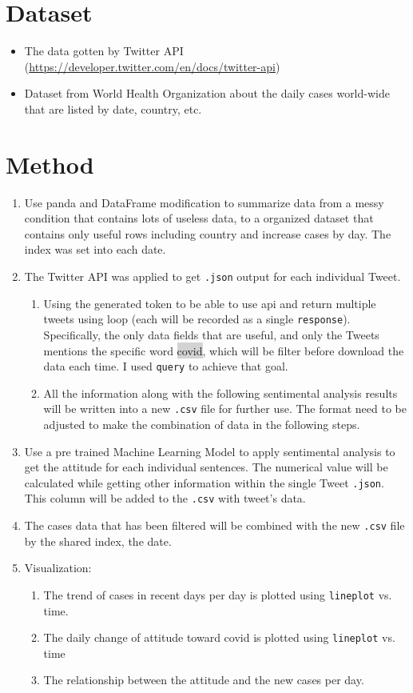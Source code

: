 \documentclass[a4paper, 12pt]{article}
\begin{document}
\section*{Dataset}
\begin{itemize}
    \item The data gotten by Twitter API (\url{https://developer.twitter.com/en/docs/twitter-api})
    \item Dataset from World Health Organization about the daily cases world-wide that are listed by date, country, etc.
\end{itemize}

\section*{Method}
\begin{enumerate}
    \item Use panda and DataFrame modification to summarize data from a messy condition that contains lots of useless data, to a organized dataset that contains only useful rows including country and increase cases by day. The index was set into each date.
    \item The Twitter API was applied to get \texttt{.json} output for each individual Tweet.
    \begin{enumerate}
        \item Using the generated token to be able to use api and return multiple tweets using loop (each will be recorded as a single \texttt{response}). Specifically, the only data fields that are useful, and only the Tweets mentions the specific word \colorbox{lightgray}{covid}, which will be filter before download the data each time. I used \texttt{query} to achieve that goal.
        \item All the information along with the following sentimental analysis results will be written into a new \texttt{.csv} file for further use. The format need to be adjusted to make the combination of data in the following steps.
    \end{enumerate}
    \item Use a pre trained Machine Learning Model to apply sentimental analysis to get the attitude for each individual sentences. The numerical value will be calculated while getting other information within the single Tweet \texttt{.json}. This column will be added to the \texttt{.csv} with tweet's data.
    \item The cases data that has been filtered will be combined with the new \texttt{.csv} file by the shared index, the date.
    \item Visualization:
    \begin{enumerate}
        \item The trend of cases in recent days per day is plotted using \texttt{lineplot} vs. time.
        \item The daily change of attitude toward covid is plotted using \texttt{lineplot} vs. time
        \item The relationship between the attitude and the new cases per day.
    \end{enumerate}
\end{enumerate}
\end{document}
